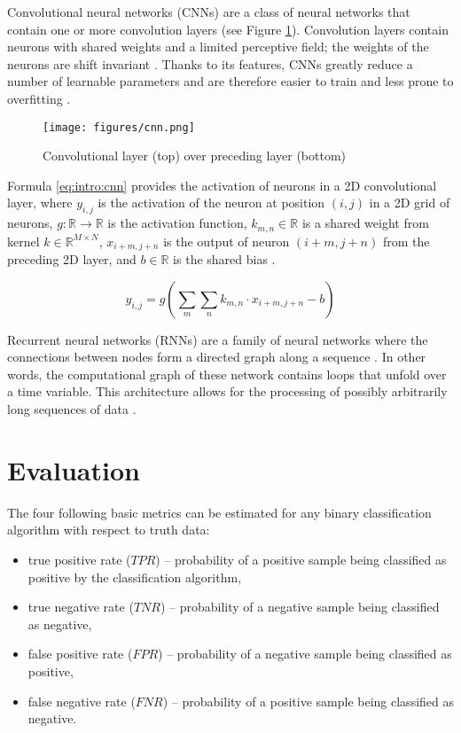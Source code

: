 Convolutional neural networks (CNNs) are a class of neural networks that
contain one or more convolution layers (see Figure \ref{fig:intro:cnn}).
Convolution layers contain neurons with shared weights and a limited perceptive
field; the weights of the neurons are shift invariant
\cite[p.~326]{goodfellow2016deep}. Thanks to its features, CNNs greatly reduce
a number of learnable parameters and are therefore easier to train and less
prone to overfitting \cite[p.~339]{goodfellow2016deep}.

\begin{figure}
  \centering
  \texttt{[image: figures/cnn.png]}
  \caption{Convolutional layer (top) over preceding layer (bottom)
    \cite{dumoulin2016guide}}
  \label{fig:intro:cnn}
\end{figure}

Formula \ref{eq:intro:cnn} provides the activation of neurons in a 2D
convolutional layer, where $y_{i, j}$ is the activation of the neuron at
position $(i, j)$ in a 2D grid of neurons, $g: \mathbb{R} \rightarrow
\mathbb{R}$ is the activation function, $k_{m, n} \in \mathbb{R}$ is a shared
weight from kernel $k \in \mathbb{R}^{M \times N}$, $x_{i + m, j + n}$ is the
output of neuron $(i + m, j + n)$ from the preceding 2D layer, and $b \in
\mathbb{R}$ is the shared bias \cite[p.~328]{goodfellow2016deep}.

\begin{equation}
  y_{i, j} = g\left(\sum_m \sum_n k_{m, n} \cdot x_{i + m, j + n} - b\right)
  \label{eq:intro:cnn}
\end{equation}

Recurrent neural networks (RNNs) are a family of neural networks where the
connections between nodes form a directed graph along a sequence
\cite[p.~368]{goodfellow2016deep}. In other words, the computational graph of
these network contains loops that unfold over a time variable. This
architecture allows for the processing of possibly arbitrarily long sequences
of data \cite[p.~367]{goodfellow2016deep}.

\section{\label{ch:background:evaluation}Evaluation}

The four following basic metrics can be estimated for any binary classification
algorithm with respect to truth data:

\begin{itemize}
  \item true positive rate ($\mathit{TPR}$) -- probability of a positive sample
    being classified as positive by the classification algorithm,
  \item true negative rate ($\mathit{TNR}$) -- probability of a negative sample
    being classified as negative,
  \item false positive rate ($\mathit{FPR}$) -- probability of a negative
    sample being classified as positive,
  \item false negative rate ($\mathit{FNR}$) -- probability of a positive
    sample being classified as negative.
\end{itemize}


